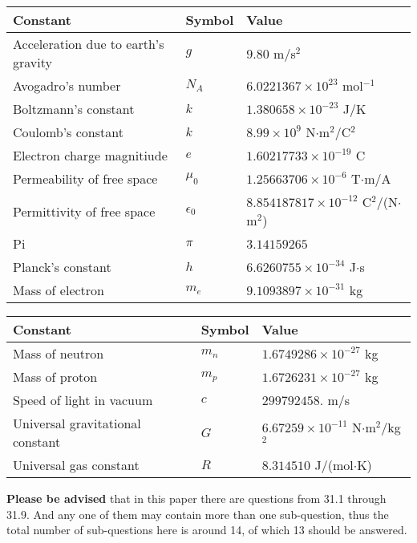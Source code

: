 \documentclass[12pt]{article}
\begin{document}
\noindent\begin{tabular}{|l|l|l|}
\hline
Constant & Symbol & Value \\
\hline
Acceleration due to earth's gravity &
$g$ &
 $ 9.80 $
m/s$^2$ \\
\hline
Avogadro's number &
$N_A$ &
 $ 6.0221367 \times 10^{23} $
mol$^{-1}$ \\
\hline
Boltzmann's constant &
$k$ &
 $ 1.380658 \times 10^{-23} $
J/K \\
\hline
Coulomb's constant &
$k$ &
 $ 8.99 \times 10^{9} $
N$\cdot $m$^2$/C$^2$ \\
\hline
Electron charge magnitiude &
$e$ &
 $ 1.60217733 \times 10^{-19} $
C \\
\hline
Permeability of free space &
$\mu _0$ &
 $ 1.25663706 \times 10^{-6} $
T$\cdot $m/A \\
\hline
Permittivity of free space &
$\epsilon _0$ &
 $ 8.854187817 \times 10^{-12} $
C$^2$/(N$\cdot $m$^2$) \\
\hline
Pi &
$\pi$ &
 $ 3.14159265 $
$ $ \\
\hline
Planck's constant &
$h$ &
 $ 6.6260755 \times 10^{-34} $
J$\cdot $s \\
\hline
Mass of electron &
$m_e$ &
 $ 9.1093897 \times 10^{-31} $
kg \\
\hline
\end{tabular}
 
 
\noindent\begin{tabular}{|l|l|l|}
\hline
Constant & Symbol & Value \\
\hline
Mass of neutron &
$m_n$ &
 $ 1.6749286 \times 10^{-27} $
kg \\
\hline
Mass of proton &
$m_p$ &
 $ 1.6726231 \times 10^{-27} $
kg \\
\hline
Speed of light in vacuum &
$c$ &
 $ 299792458. $
m/s \\
\hline
Universal gravitational constant &
$G$ &
 $ 6.67259 \times 10^{-11} $
N$\cdot $m$^2$/kg$^2$ \\
\hline
Universal gas constant &
$R$ &
 $ 8.314510 $
J/(mol$\cdot $K) \\
\hline
\end{tabular}
 
 
{\textbf{\large{Please be advised}}} that in this paper there are questions from
31.1 through
31.9.
And any one of them may contain more than one sub-question, thus the total number
of sub-questions here is around 14, of which
13 should be answered.
 
\vspace{0.3in}
 
\end{document}
